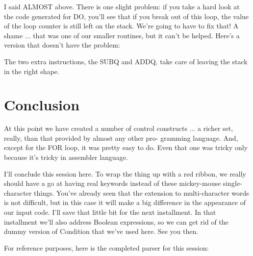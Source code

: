 \documentclass[float=false, crop=false]{standalone}
\begin{document}
I said ALMOST above. There is one slight problem: if you take a hard look at the
code generated for DO, you'll see that if you break out of this loop, the value
of the loop counter is still left on the stack. We're going to have to fix that!
A shame ... that was one of our smaller routines, but it can't be helped. Here's
a version that doesn't have the problem:


The two extra instructions, the SUBQ and ADDQ, take care of leaving the stack in
the right shape.

\section{Conclusion}

At this point we have created a number of control constructs ... a richer set,
really, than that provided by almost any other pro- gramming language. And,
except for the FOR loop, it was pretty easy to do. Even that one was tricky only
because it's tricky in assembler language.

I'll conclude this session here. To wrap the thing up with a red ribbon, we
really should have a go at having real keywords instead of these mickey-mouse
single-character things. You've already seen that the extension to
multi-character words is not difficult, but in this case it will make a big
difference in the appearance of our input code. I'll save that little bit for
the next installment. In that installment we'll also address Boolean
expressions, so we can get rid of the dummy version of Condition that we've used
here. See you then.

For reference purposes, here is the completed parser for this session:
\end{document}
